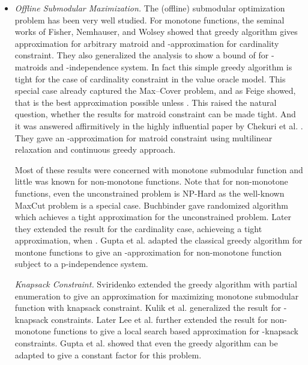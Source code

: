 \documentclass[oneside,letterpaper]{scrartcl} \usepackage{macros}
\begin{document}
\iffalse
\begin{itemize}
\item \textit{Offline Submodular Maximization.} The (offline)
  submodular optimization problem has been very well studied. For
  monotone functions, the seminal works of Fisher, Nemhauser, and
  Wolsey \cite{nwf-mssf1-78} showed that greedy algorithm gives 
  approximation for arbitrary matroid and -approximation for
  cardinality constraint. They also generalized the analysis to show a
  bound of  for -matroids and -independence system. In
  fact this simple greedy algorithm is tight for the case of
  cardinality constraint in the value oracle model. This special case
  already captured the Max--Cover problem, and as Feige \cite{f-98}
  showed, that  is the best approximation possible unless
  . This raised the natural question, whether the results for
  matroid constraint can be made tight. And it was answered
  affirmitively in the highly influential paper by Chekuri et
  al. \cite{ccpv-11}. They gave an -approximation for matroid
  constraint using multilinear relaxation and continuous greedy
  approach.

  Most of these results were concerned with monotone submodular
  function and little was known for non-monotone functions. Note that
  for non-monotone functions, even the unconstrained problem is
  NP-Hard as the well-known MaxCut problem is a special
  case. Buchbinder \etal \cite{bfjs-12} gave randomized algorithm
  which achieves a tight  approximation for the unconstrained
  problem. Later they extended the result for the cardinality case,
  achieveing a tight  approximation, when 
  \cite{bfns-smcc-14}. Gupta et al. \cite{grst-10} adapted the
  classical greedy algorithm for montone functions to give an
  -approximation for non-monotone function subject to a
  p-independence system.

  \textit{Knapsack Constraint.} Sviridenko extended the greedy
  algorithm with partial enumeration to give an 
  approximation for maximizing monotone submodular function with
  knapsack constraint. Kulik et al. \cite{kst-11} generalized the
  result for -knapsack constraints. Later Lee et al. \cite{lmns-09}
  further extended the result for non-monotone functions to give a
  local search based  approximation for -knapsack
  constraints. Gupta et al. \cite{grst-10} showed that even the greedy
  algorithm can be adapted to give a constant factor for this problem.


\end{itemize}
\end{document}
